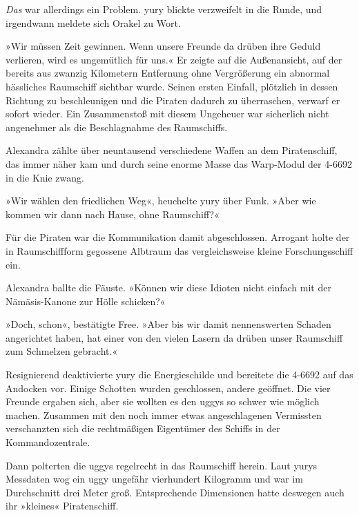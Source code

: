 \emph{Das} war allerdings ein Problem. yury blickte verzweifelt in die Runde, und irgendwann meldete sich Orakel zu Wort.

»Wir müssen Zeit gewinnen. Wenn unsere Freunde da drüben ihre Geduld verlieren, wird es ungemütlich für uns.« Er zeigte auf die Außenansicht, auf der bereits aus zwanzig Kilometern Entfernung ohne Vergrößerung ein abnormal hässliches Raumschiff sichtbar wurde. Seinen ersten Einfall, plötzlich in dessen Richtung zu beschleunigen und die Piraten dadurch zu überraschen, verwarf er sofort wieder. Ein Zusammenstoß mit diesem Ungeheuer war sicherlich nicht angenehmer als die Beschlagnahme des Raumschiffs.

Alexandra zählte über neuntausend verschiedene Waffen an dem Piratenschiff, das immer näher kam und durch seine enorme Masse das Warp-Modul der 4-6692 in die Knie zwang.


»Wir wählen den friedlichen Weg«, heuchelte yury über Funk. »Aber wie kommen wir dann nach Hause, ohne Raumschiff?«


Für die Piraten war die Kommunikation damit abgeschlossen. Arrogant holte der in Raumschiffform gegossene Albtraum das vergleichsweise kleine Forschungsschiff ein.

Alexandra ballte die Fäuste. »Können wir diese Idioten nicht einfach mit der Nämäsis-Kanone zur Hölle schicken?«

»Doch, schon«, bestätigte Free. »Aber bis wir damit nennenswerten Schaden angerichtet haben, hat einer von den vielen Lasern da drüben unser Raumschiff zum Schmelzen gebracht.«

Resignierend deaktivierte yury die Energieschilde und bereitete die 4-6692 auf das Andocken vor. Einige Schotten wurden geschlossen, andere geöffnet. Die vier Freunde ergaben sich, aber sie wollten es den uggys so schwer wie möglich machen. Zusammen mit den noch immer etwas angeschlagenen Vermissten verschanzten sich die rechtmäßigen Eigentümer des Schiffs in der Kommandozentrale.

Dann polterten die uggys regelrecht in das Raumschiff herein. Laut yurys Messdaten wog ein uggy ungefähr vierhundert Kilogramm und war im Durchschnitt drei Meter groß. Entsprechende Dimensionen hatte deswegen auch ihr »kleines« Piratenschiff.

